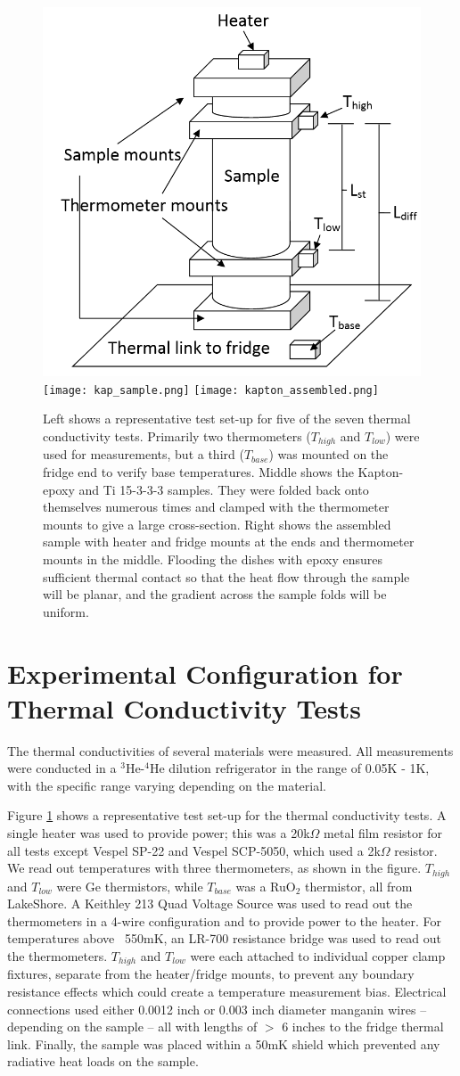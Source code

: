 \documentclass[final]{svjour2}
\begin{document}
\begin{figure}[h]
\centering
\includegraphics[width = .4\textwidth]{Rep_test_sample.png}
\qquad
\texttt{[image: kap\_sample.png]}
\texttt{[image: kapton\_assembled.png]}

\caption{{\small Left shows a representative test set-up for five of the seven thermal conductivity tests. Primarily two thermometers ($T_{high}$ and $T_{low}$) were used for measurements, but a third ($T_{base}$) was mounted on the fridge end to verify base temperatures. Middle shows the Kapton-epoxy and Ti 15-3-3-3 samples. They were folded back onto themselves numerous times and clamped with the thermometer mounts to give a large cross-section. Right shows the assembled sample with heater and fridge mounts at the ends and thermometer mounts in the middle. Flooding the dishes with epoxy ensures sufficient thermal contact so that the heat flow through the sample will be planar, and the gradient across the sample folds will be uniform. }}
\label{setup}
\end{figure}

\section{Experimental Configuration for Thermal Conductivity Tests}
The thermal conductivities of several materials were measured. All measurements were conducted in a $^3$He-$^4$He dilution refrigerator in the range of 0.05K - 1K, with the specific range varying depending on the material.

Figure \ref{setup} shows a representative test set-up for the thermal conductivity tests. A single heater was used to provide power; this was a 20k$\Omega$ metal film resistor for all tests except Vespel SP-22 and Vespel SCP-5050, which used a 2k$\Omega$ resistor. We read out temperatures with three thermometers, as shown in the figure. $T_{high}$ and $T_{low}$ were Ge thermistors, while $T_{base}$ was a RuO$_2$ thermistor, all from LakeShore\footnotemark.  A Keithley 213 Quad Voltage Source was used to read out the thermometers in a 4-wire configuration and to provide power to the heater. For temperatures above ~550mK, an LR-700 resistance bridge was used to read out the thermometers. $T_{high}$ and $T_{low}$ were each attached to individual copper clamp fixtures, separate from the heater/fridge mounts, to prevent any boundary resistance effects which could create a temperature measurement bias. Electrical connections used either 0.0012 inch or 0.003 inch diameter manganin wires -- depending on the sample -- all with lengths of $>$ 6 inches to the fridge thermal link. Finally, the sample was placed within a 50mK shield which prevented any radiative heat loads on the sample.
\end{document}
